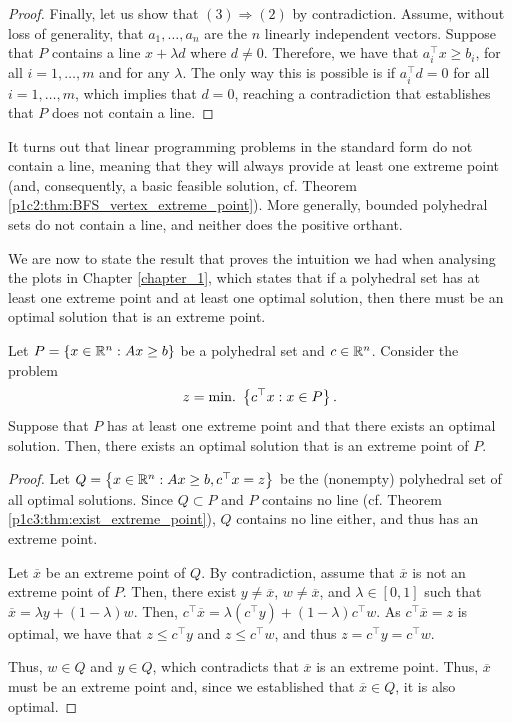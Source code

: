 \begin{proof}
	Finally, let us show that $(3) \Rightarrow (2)$ by contradiction. Assume, without loss of generality, that $a_1, \dots, a_n$ are the $n$ linearly independent vectors. Suppose that $P$ contains a line $x + \lambda d$ where $d \neq 0$. Therefore, we have that $a_i^\top x \ge b_i$, for all $i = 1, \dots, m$ and for any $\lambda$. The only way this is possible is if $a_i^\top d =0$ for all $i = 1, \dots, m$, which implies that $d=0$, reaching a contradiction that establishes that $P$ does not contain a line.
\end{proof}


It turns out that linear programming problems in the standard form do not contain a line, meaning that they will always provide at least one extreme point (and, consequently, a basic feasible solution, cf. Theorem \ref{p1c2:thm:BFS_vertex_extreme_point}). More generally, bounded polyhedral sets do not contain a line, and neither does the positive orthant.

We are now to state the result that proves the intuition we had when analysing the plots in Chapter \ref{chapter_1}, which states that if a polyhedral set has at least one extreme point and at least one optimal solution, then there must be an optimal solution that is an extreme point.

\begin{theorem}\label{p1c3:thm:opt_extreme}
		Let $P = \left\{ x \in \mathbb{R}^n : Ax \geq b \right \}$ be a polyhedral set and $c \in \mathbb{R}^n$. Consider the problem 
			\begin{equation*}
		    		z = \mathop{\text{min.~}}\left\{ c^\top x : x \in P \right \}.					
			\end{equation*}
		Suppose that $P$ has at least one extreme point and that there exists an optimal solution. Then, there exists an optimal solution that is an extreme point of $P$.
\end{theorem}

\begin{proof}
	Let $Q = \left\{ x \in \mathbb{R}^n : Ax \geq b, c^\top x = z \right \}$ be the (nonempty) polyhedral set of all optimal solutions. Since $Q \subset P$ and $P$ contains no line (cf. Theorem \ref{p1c3:thm:exist_extreme_point}), $Q$ contains no line either, and thus has an extreme point.

	Let $\overline{x}$ be an extreme point of $Q$. By contradiction, assume that $\overline{x}$ is not an extreme point of $P$. Then, there exist $y \neq \overline{x}$, $w \neq \overline{x}$, and $\lambda \in [0,1]$ such that $\overline{x} = \lambda y + (1-\lambda)w$. Then, $c^\top \overline{x} = \lambda (c^\top y) + (1-\lambda)c^\top w$. As $c^\top \overline{x} = z$ is optimal, we have that $z \leq c^\top y$ and $z \leq c^\top w$,  and thus $z = c^\top y = c^\top w$. 
	
	Thus, $w \in Q$ and $y \in Q$, which contradicts that $\overline{x}$ is an extreme point. Thus, $\overline{x}$ must be an extreme point and, since we established that $\overline{x} \in Q$, it is also optimal. 
\end{proof}

